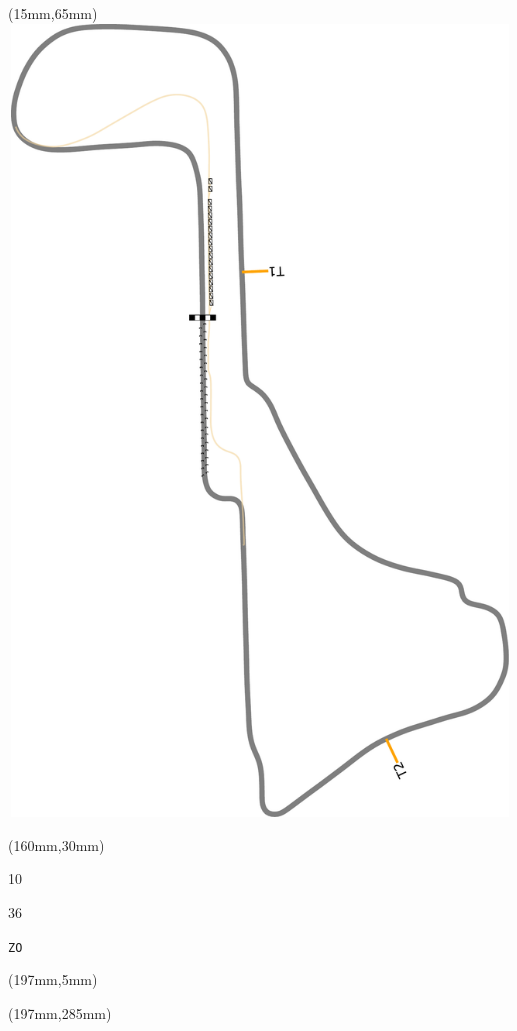 \begin{textblock*}{185mm}(15mm,65mm)%
\centering
\mbox{\includegraphics[width=185mm,height=210mm,keepaspectratio]{PT/ZO.pdf}}
\end{textblock*}
\begin{textblock*}{40mm}(160mm,30mm)%
\Large
\par{} 
\par10 
\par36 
\par\hfill\tiny\tt ZO\\
\end{textblock*}
\begin{textblock*}{20mm}(197mm,5mm)%
\fbox{\thepage}
\label{ZO}
\end{textblock*}
\begin{textblock*}{20mm}(197mm,285mm)%
\fbox{\thepage}
\end{textblock*}

